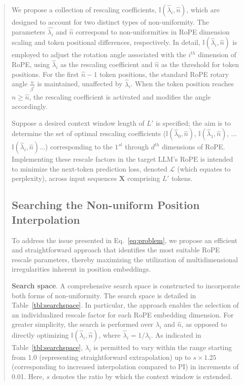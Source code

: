 \begin{abstract}
We propose a collection of rescaling coefficients, $\mathbb{I}(\hat{\lambda}_{i},\hat{n})$, which are designed to account for two distinct types of non-uniformity. The parameters $\hat{\lambda_i}$ and $\hat{n}$ correspond to non-uniformities in RoPE dimension scaling and token positional differences, respectively. In detail, $\mathbb{I}(\hat{\lambda}_{i},\hat{n})$ is employed to adjust the rotation angle associated with the $i^{th}$ dimension of RoPE, using $\hat\lambda_{i}$ as the rescaling coefficient and $\hat{n}$ as the threshold for token positions. For the first $\hat{n}-1$ token positions, the standard RoPE rotary angle $\frac{n}{\beta^i}$ is maintained, unaffected by $\hat\lambda_{i}$. When the token position reaches $n \ge \hat{n}$, the rescaling coefficient is activated and modifies the angle accordingly.

Suppose a desired context window length of $L'$ is specified; the aim is to determine the set of optimal rescaling coefficients ($\mathbb{I}(\hat{\lambda}_{0},\hat{n})$, $\mathbb{I}(\hat{\lambda}_{1},\hat{n})$, ...$\mathbb{I}(\hat{\lambda}_{i},\hat{n})$...) corresponding to the $1^{st}$ through $d^{th}$ dimensions of RoPE. Implementing these rescale factors in the target $\text{LLM}$'s $\text{RoPE}$ is intended to minimize the next-token prediction loss, denoted $\mathcal{L}$ (which equates to perplexity), across input sequences $\mathbf{X}$ comprising $L'$ tokens.

\subsection{Searching the Non-uniform Position Interpolation}

To address the issue presented in Eq.~\ref{eq:problem}, we propose an efficient and straightforward approach that identifies the most suitable RoPE rescale parameters, thereby maximizing the utilization of multidimensional irregularities inherent in position embeddings.

\textbf{Search space}. A comprehensive search space is constructed to incorporate both forms of non-uniformity. The search space is detailed in Table~\ref{tbl:searchspace}. In particular, the approach enables the selection of an individualized rescale factor for each RoPE embedding dimension. For greater simplicity, the search is performed over $\lambda_i$ and $\hat{n}$, as opposed to directly optimizing $\mathbb{I}(\hat{\lambda}_{i},\hat{n})$, where  $\hat{\lambda}_{i}=1/\lambda_i$. As indicated in Table~\ref{tbl:searchspace}, $\lambda_i$ is permitted to vary within the range starting from 1.0 (representing straightforward extrapolation) up to $s\times1.25$ (corresponding to increased interpolation compared to PI) in increments of 0.01. Here, $s$ denotes the ratio by which the context window is extended.


\end{abstract}
